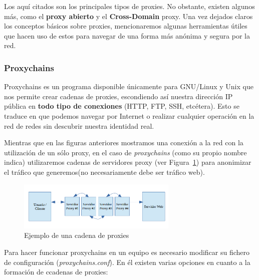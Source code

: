 Los aquí citados son los principales tipos de proxies. No obstante, existen algunos más, como el \textbf{proxy abierto} y el \textbf{Cross-Domain }proxy.
Una vez dejados claros los conceptos básicos sobre proxies, mencionaremos algunas herramientas útiles que hacen uso de estos para navegar de una forma más anónima y segura por la red.

\subsubsection{Proxychains}

Proxychains es un programa disponible únicamente para GNU/Linux y Unix que nos permite crear cadenas de proxies, escondiendo así nuestra dirección IP pública en \textbf{todo tipo de conexiones} (HTTP, FTP, SSH, etcétera). 
Esto se traduce en que podemos navegar por Internet o realizar cualquier operación en la red de redes sin descubrir nuestra identidad real.

Mientras que en las figuras anteriores mostramos una conexión a la red con la utilización de un sólo proxy, en el caso de \textit{proxychains} (como su propio nombre indica) utilizaremos cadenas de servidores proxy (ver Figura~\ref{fig:proxy_chain}) para anonimizar~\cite{article:proxychains} el tráfico que generemos(no necesariamente debe ser tráfico web).

\begin{figure}[H]
	\centerline{
		\mbox{\includegraphics[width=3.00in]{images/proxy_chain.png}}
	}
	\caption{Ejemplo de una cadena de proxies}
	\label{fig:proxy_chain}
\end{figure}

Para hacer funcionar proxychains en un equipo es necesario modificar su fichero de configuración (\textit{proxychains.conf}). En él existen varias opciones en cuanto a la formación de ccadenas de proxies:


